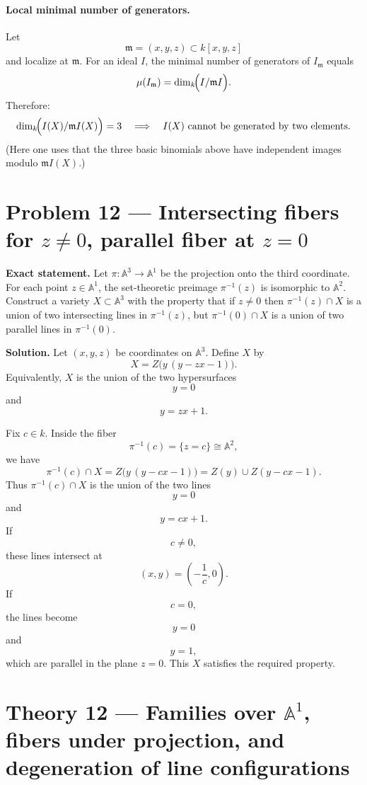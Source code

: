 \documentclass[12pt,a4paper]{article}
\theoremstyle{plain}
\theoremstyle{definition}      %
\begin{document}
\paragraph{Local minimal number of generators.}
Let
\[
\mathfrak m=(x,y,z)\subset k[x,y,z]
\]
and localize at $\mathfrak m$.
For an ideal $I$, the minimal number of generators of $I_{\mathfrak m}$ equals
\[
\mu(I_{\mathfrak m})
=
\dim_k\!\Bigl(I/ \mathfrak m I\Bigr).
\]
Therefore:
\[
\dim_k\!\Bigl(I(X)/\mathfrak m I(X)\Bigr)=3
\quad\Longrightarrow\quad
I(X)\ \text{cannot be generated by two elements}.
\]
(Here one uses that the three basic binomials above have independent images modulo $\mathfrak m I(X)$.)

\medskip

\section{Problem 12 — Intersecting fibers for $z\neq 0$, parallel fiber at $z=0$}

\textbf{Exact statement.}
Let $\pi:\mathbb A^3\to \mathbb A^1$ be the projection onto the third coordinate.
For each point $z\in\mathbb A^1$, the set-theoretic preimage $\pi^{-1}(z)$ is isomorphic to $\mathbb A^2$.
Construct a variety $X\subset \mathbb A^3$ with the property that if $z\neq 0$ then
$\pi^{-1}(z)\cap X$ is a union of two intersecting lines in $\pi^{-1}(z)$,
but $\pi^{-1}(0)\cap X$ is a union of two parallel lines in $\pi^{-1}(0)$.

\textbf{Solution.}
Let $(x,y,z)$ be coordinates on $\mathbb A^3$.
Define $X$ by
\[
X
=
Z\bigl(y\,(y-zx-1)\bigr).
\]
Equivalently, $X$ is the union of the two hypersurfaces
\[
y=0
\]
and
\[
y=zx+1.
\]

Fix $c\in k$.
Inside the fiber
\[
\pi^{-1}(c)
=
\{z=c\}
\cong
\mathbb A^2,
\]
we have
\[
\pi^{-1}(c)\cap X
=
Z\bigl(y\,(y-cx-1)\bigr)
=
Z(y)\cup Z(y-cx-1).
\]
Thus $\pi^{-1}(c)\cap X$ is the union of the two lines
\[
y=0
\]
and
\[
y=cx+1.
\]
If
\[
c\neq 0,
\]
these lines intersect at
\[
(x,y)=\left(-\frac{1}{c},0\right).
\]
If
\[
c=0,
\]
the lines become
\[
y=0
\]
and
\[
y=1,
\]
which are parallel in the plane $z=0$.
This $X$ satisfies the required property.

\section*{Theory 12 — Families over $\mathbb{A}^1$, fibers under projection, and degeneration of line configurations}
\end{document}
